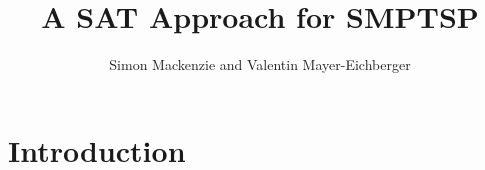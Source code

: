 \documentclass{article}
\title{A SAT Approach for SMPTSP}
\author{Simon Mackenzie and Valentin Mayer-Eichberger}
\begin{document}
 

\maketitle

\begin{abstract} 
\end{abstract}

\section{Introduction}
\end{document}
